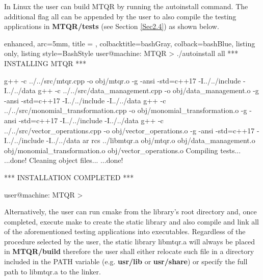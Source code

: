 \documentclass[a4paper, twosided]{book}
\begin{document}
In Linux the user can build MTQR by running the \colorbox{poliGrayBlue}{autoinstall} command. The additional flag \colorbox{poliGrayBlue}{all} can be appended by the user to also compile the testing applications in \colorbox{poliGrayBlue}{\textbf{MTQR/tests}} (see Section \ref{Sec2.4}) as shown below.

\begin{tcblisting}{enhanced,
                   arc=5mm,
                   title = \color{black}{\large \ttfamily Build using the shell script},
                   colbacktitle=bashGray,
                   colback=bashBlue,
                   listing only,
                   listing style=BashStyle}
user@machine: MTQR > ./autoinstall all
 *** INSTALLING MTQR ***

g++ -c ../../src/mtqr.cpp -o obj/mtqr.o -g -ansi -std=c++17  -I../../include  -I../../data
g++ -c ../../src/data_management.cpp -o obj/data_management.o -g -ansi -std=c++17  -I../../include  -I../../data
g++ -c ../../src/monomial_transformation.cpp -o obj/monomial_transformation.o -g -ansi -std=c++17  -I../../include  -I../../data
g++ -c ../../src/vector_operations.cpp -o obj/vector_operations.o -g -ansi -std=c++17  -I../../include  -I../../data
ar rcs ../libmtqr.a obj/mtqr.o obj/data_management.o obj/monomial_transformation.o obj/vector_operations.o
Compiling tests...
...done!
Cleaning object files...
...done!
 
 *** INSTALLATION COMPLETED ***

 user@machine: MTQR >
\end{tcblisting}
\vspace{0.25cm}

\noindent
Alternatively, the user can run \colorbox{poliGrayBlue}{cmake} from the library's root directory and, once completed, execute \colorbox{poliGrayBlue}{make} to create the static library and also compile and link all of the aforementioned testing applications into executables. Regardless of the procedure selected by the user, the static library \colorbox{poliGrayBlue}{libmtqr.a} will always be placed in \colorbox{poliGrayBlue}{\textbf{MTQR/build}} therefore the user shall either relocate such file in a directory included in the \colorbox{poliGrayBlue}{PATH} variable (e.g. \colorbox{poliGrayBlue}{\textbf{usr/lib}} or \colorbox{poliGrayBlue}{\textbf{usr/share}}) or specify the full path to \colorbox{poliGrayBlue}{libmtqr.a} to the linker.
\end{document}
